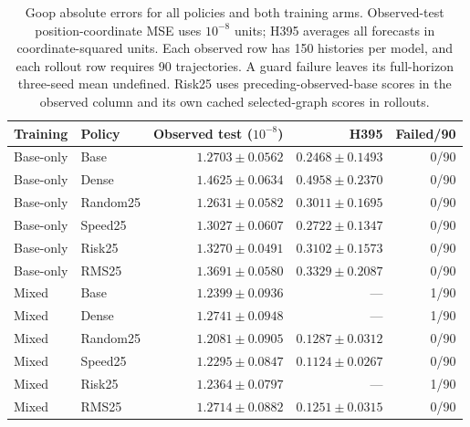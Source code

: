 \begin{table}[!ht]
\centering\small
\setlength{\tabcolsep}{5pt}\renewcommand{\arraystretch}{1.12}
\caption{Goop absolute errors for all policies and both training arms. Observed-test position-coordinate MSE uses $10^{-8}$ units; H395 averages all forecasts in coordinate-squared units. Each observed row has 150 histories per model, and each rollout row requires 90 trajectories. A guard failure leaves its full-horizon three-seed mean undefined. Risk25 uses preceding-observed-base scores in the observed column and its own cached selected-graph scores in rollouts.}
\label{tab:goop-all-observed}
\label{tab:goop-all-rollouts}
\begin{tabular}{llrrr}
\toprule
Training & Policy & Observed test ($10^{-8}$) & H395 & Failed/90\\
\midrule
Base-only & Base & $1.2703\pm0.0562$ & $0.2468\pm0.1493$ & 0/90\\
Base-only & Dense & $1.4625\pm0.0634$ & $0.4958\pm0.2370$ & 0/90\\
Base-only & Random25 & $1.2631\pm0.0582$ & $0.3011\pm0.1695$ & 0/90\\
Base-only & Speed25 & $1.3027\pm0.0607$ & $0.2722\pm0.1347$ & 0/90\\
Base-only & Risk25 & $1.3270\pm0.0491$ & $0.3102\pm0.1573$ & 0/90\\
Base-only & RMS25 & $1.3691\pm0.0580$ & $0.3329\pm0.2087$ & 0/90\\
Mixed & Base & $1.2399\pm0.0936$ & --- & 1/90\\
Mixed & Dense & $1.2741\pm0.0948$ & --- & 1/90\\
Mixed & Random25 & $1.2081\pm0.0905$ & $0.1287\pm0.0312$ & 0/90\\
Mixed & Speed25 & $1.2295\pm0.0847$ & $0.1124\pm0.0267$ & 0/90\\
Mixed & Risk25 & $1.2364\pm0.0797$ & --- & 1/90\\
Mixed & RMS25 & $1.2714\pm0.0882$ & $0.1251\pm0.0315$ & 0/90\\
\bottomrule
\end{tabular}
\end{table}
